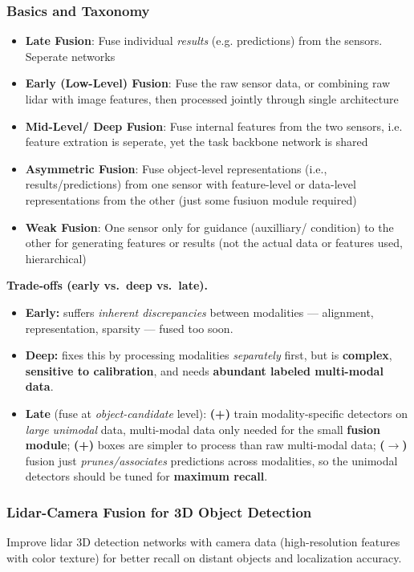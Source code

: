 \documentclass{article}
\begin{document}
\subsubsection{Basics and Taxonomy}
\begin{itemize}
    \item \textbf{Late Fusion}: Fuse individual \textit{results} (e.g. predictions) from the sensors. Seperate networks
    \item \textbf{Early (Low-Level) Fusion}: Fuse the raw sensor data, or combining raw lidar with image features, then processed jointly through single architecture
    \item \textbf{Mid-Level/ Deep Fusion}: Fuse internal features from the two sensors, i.e. feature extration is seperate, yet the task backbone network is shared
    \item \textbf{Asymmetric Fusion}: Fuse object-level representations (i.e., results/predictions) from one sensor with feature-level or data-level representations from the other (just some fusiuon module required)
    \item \textbf{Weak Fusion}: One sensor only for guidance (auxilliary/ condition) to the other for generating features or results (not the actual data or features used, hierarchical)
\end{itemize}

\textbf{Trade-offs (early vs.\ deep vs.\ late).}
\begin{itemize}
    \item \textbf{Early:} suffers \textit{inherent discrepancies} between modalities --- alignment, representation, sparsity --- fused too soon.
    \item \textbf{Deep:} fixes this by processing modalities \textit{separately} first, but is \textbf{complex}, \textbf{sensitive to calibration}, and needs \textbf{abundant labeled multi-modal data}.
    \item \textbf{Late} (fuse at \textit{object-candidate} level): \textbf{(+)} train modality-specific detectors on \textit{large unimodal} data, multi-modal data only needed for the small \textbf{fusion module}; \textbf{(+)} boxes are simpler to process than raw multi-modal data; \textbf{($\rightarrow$)} fusion just \textit{prunes/associates} predictions across modalities, so the unimodal detectors should be tuned for \textbf{maximum recall}.
\end{itemize}

\subsubsection{Lidar-Camera Fusion for 3D Object Detection}
Improve lidar 3D detection networks with camera data (high-resolution features with color texture) for better recall on distant objects and localization accuracy.
\end{document}

